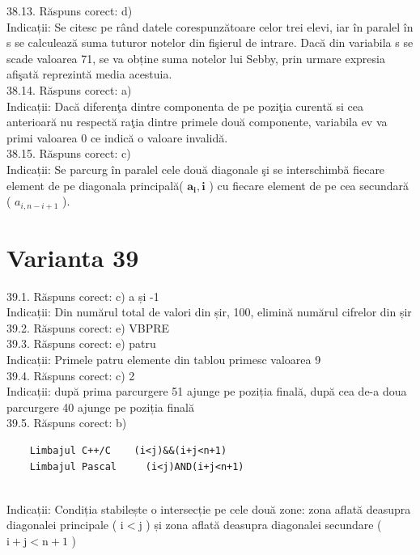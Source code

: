 38.13. Răspuns corect: d)\\
Indicații: Se citesc pe rând datele corespunzătoare celor trei elevi, iar în paralel în s se calculează suma tuturor notelor din fişierul de intrare. Dacă din variabila s se scade valoarea 71, se va obține suma notelor lui Sebby, prin urmare expresia afişată reprezintă media acestuia.\\

38.14. Răspuns corect: a)\\
Indicații: Dacă diferenţa dintre componenta de pe poziţia curentă si cea anterioară nu respectă raţia dintre primele două componente, variabila ev va primi valoarea 0 ce indică o valoare invalidă.\\

38.15. Răspuns corect: c)\\
Indicații: Se parcurg în paralel cele două diagonale şi se interschimbă fiecare element de pe diagonala principală( $\mathbf{a}_{\mathbf{i}}, \mathbf{i}$ ) cu fiecare element de pe cea secundară ( $a_{i, n-i+1}$ ).\\

\section*{Varianta 39}

39.1. Răspuns corect: c) a și -1\\
Indicații: Din numărul total de valori din șir, 100, elimină numărul cifrelor din șir\\

39.2. Răspuns corect: e) VBPRE\\

39.3. Răspuns corect: e) patru\\
Indicații: Primele patru elemente din tablou primesc valoarea 9\\

39.4. Răspuns corect: c) 2\\
Indicații: după prima parcurgere 51 ajunge pe poziția finală, după cea de-a doua parcurgere 40 ajunge pe poziția finală\\

39.5. Răspuns corect: b) \begin{verbatim}
    Limbajul C++/C    (i<j)&&(i+j<n+1) 
    Limbajul Pascal     (i<j)AND(i+j<n+1)
\end{verbatim}\\
Indicații: Condiția stabilește o intersecție pe cele două zone: zona aflată deasupra diagonalei principale ( $\mathrm{i}<\mathrm{j}$ ) și zona aflată deasupra diagonalei secundare ( $\mathrm{i}+\mathrm{j}<\mathrm{n}+1$ )\\

